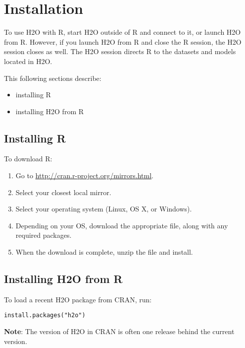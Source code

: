 

\section{Installation}

To use H2O with R, start H2O outside of R and connect to it, or launch H2O from R. However, if you launch H2O from R and close the R session, the H2O session closes as well. The H2O session directs R to the datasets and models located in H2O.

This following sections describe: 

\begin{itemize}
\item installing R 
\item installing H2O from R
\end{itemize}

\subsection{Installing R}

To download R:
\begin{enumerate}
\item Go to \url{http://cran.r-project.org/mirrors.html}. 
\item Select your closest local mirror. 
\item Select your operating system (Linux, OS X, or Windows). 
\item Depending on your OS, download the appropriate file, along with any required packages. 
\item When the download is complete, unzip the file and install. \\
\end{enumerate}

\subsection{Installing H2O from R}

To load a recent H2O package from CRAN, run:

\begin{lstlisting}[style=R]
install.packages("h2o")
\end{lstlisting}

{\bf{Note}}: The version of H2O in CRAN is often one release behind the current version.

